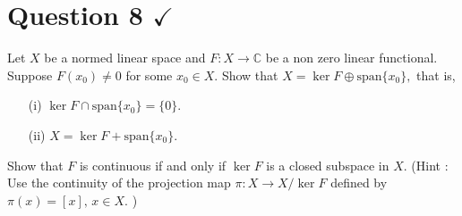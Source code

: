 \section{Question 8 \texorpdfstring{$\checkmark$}{}}
\horz
Let $X$ be a normed linear space and $F: X \to \mathbb C$ be a non zero linear functional. Suppose $F(x_0) \neq 0$ for some $x_0\in X.$ Show that $X= \ker F \oplus \mbox{span} \{x_0\},$ that is,
\begin{itemize}
\item[(i)] $\ker F \cap \mbox{span} \{x_0\} = \{0\}.$
\item[(ii)] $ X = \ker F + \mbox{span} \{x_0\}.$
\end{itemize}
Show that $F$ is continuous if and only if $\ker F$ is a closed subspace in $X.$ (Hint : Use the continuity of the projection map $\pi:X \to  X/\ker F$ defined by $\pi(x) = [x],\,x\in X.$ )
\horz
